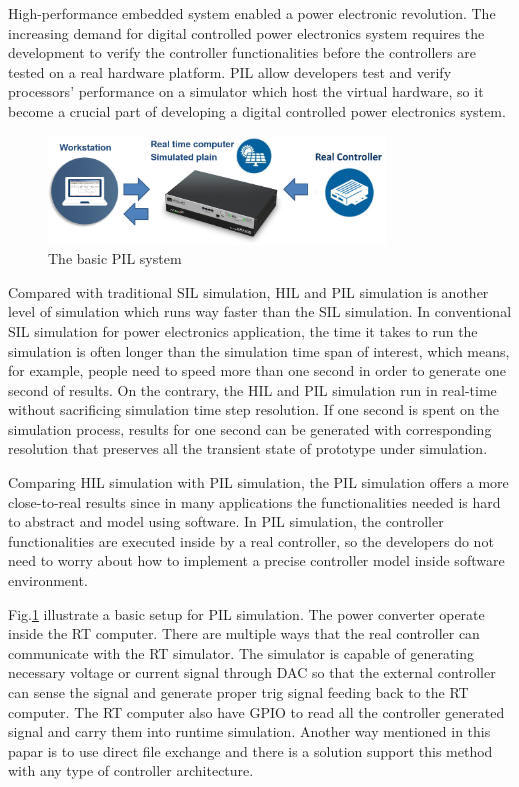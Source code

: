 High-performance embedded system enabled a power electronic revolution. The increasing demand for digital controlled power electronics system requires the development to verify the controller functionalities before the controllers are tested on a real hardware platform. \gls{PIL} allow developers test and verify processors' performance on a simulator which host the virtual hardware, so it become a crucial part of developing a digital controlled power electronics system.  
\begin{figure}[b]
    \centering
    \includegraphics[width = 0.8\textwidth]{figures/pil.png}
    \caption{The basic PIL system}
    \label{fig:pil sys}
\end{figure}

Compared with traditional \gls{SIL} simulation, \gls{HIL} and \gls{PIL} simulation is another level of simulation which runs way faster than the \gls{SIL} simulation. In conventional \gls{SIL} simulation for power electronics application, the time it takes to run the simulation is often longer than the simulation time span of interest, which means, for example,  people need to speed more than one second in order to generate one second of results. On the contrary, the \gls{HIL} and \gls{PIL} simulation run in real-time without sacrificing simulation time step resolution. If one second is spent on the simulation process, results for one second can be generated with corresponding resolution that preserves all the transient state of prototype under simulation. 

Comparing \gls{HIL} simulation with \gls{PIL} simulation, the \gls{PIL} simulation offers a more close-to-real results since in many applications the functionalities needed is hard to abstract and model using software. In \gls{PIL} simulation, the controller functionalities are executed inside by a real controller, so the developers do not need to worry about how to implement a precise controller model inside software environment.

Fig.\ref{fig:pil sys} illustrate a basic setup for \gls{PIL} simulation. The power converter operate inside the \gls{RT} computer. There are  multiple ways that the real controller can communicate with the \gls{RT} simulator. The simulator is capable of generating necessary voltage or current signal through \gls{DAC} so that the external controller can sense the signal and generate proper trig signal feeding back to the \gls{RT} computer. The \gls{RT} computer also have \gls{GPIO} to read all the controller generated signal and carry them into runtime simulation. Another way mentioned in this papar\cite{7497546} is to use direct file exchange and there is a solution support this method with any type of controller architecture. 

